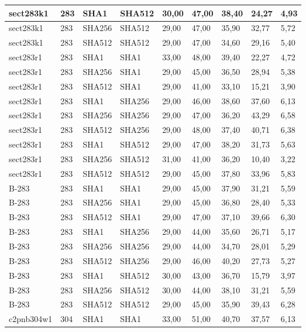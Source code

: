 \begin{longtable}{| l | l | l | l | l |l |l |l |l |}
sect283k1 & 283 & SHA1 & SHA512 & 30,00 & 47,00 & 38,40 & 24,27 & 4,93 \\ \hline 
sect283k1 & 283 & SHA256 & SHA512 & 29,00 & 47,00 & 35,90 & 32,77 & 5,72 \\ \hline 
sect283k1 & 283 & SHA512 & SHA512 & 29,00 & 47,00 & 34,60 & 29,16 & 5,40 \\ \hline 
sect283r1 & 283 & SHA1 & SHA1 & 33,00 & 48,00 & 39,40 & 22,27 & 4,72 \\ \hline 
sect283r1 & 283 & SHA256 & SHA1 & 29,00 & 45,00 & 36,50 & 28,94 & 5,38 \\ \hline 
sect283r1 & 283 & SHA512 & SHA1 & 29,00 & 41,00 & 33,10 & 15,21 & 3,90 \\ \hline 
sect283r1 & 283 & SHA1 & SHA256 & 29,00 & 46,00 & 38,60 & 37,60 & 6,13 \\ \hline 
sect283r1 & 283 & SHA256 & SHA256 & 29,00 & 47,00 & 36,20 & 43,29 & 6,58 \\ \hline 
sect283r1 & 283 & SHA512 & SHA256 & 29,00 & 48,00 & 37,40 & 40,71 & 6,38 \\ \hline 
sect283r1 & 283 & SHA1 & SHA512 & 29,00 & 47,00 & 38,20 & 31,73 & 5,63 \\ \hline 
sect283r1 & 283 & SHA256 & SHA512 & 31,00 & 41,00 & 36,20 & 10,40 & 3,22 \\ \hline 
sect283r1 & 283 & SHA512 & SHA512 & 29,00 & 45,00 & 37,80 & 33,96 & 5,83 \\ \hline 
B-283 & 283 & SHA1 & SHA1 & 29,00 & 45,00 & 37,90 & 31,21 & 5,59 \\ \hline 
B-283 & 283 & SHA256 & SHA1 & 29,00 & 45,00 & 36,80 & 28,40 & 5,33 \\ \hline 
B-283 & 283 & SHA512 & SHA1 & 29,00 & 47,00 & 37,10 & 39,66 & 6,30 \\ \hline 
B-283 & 283 & SHA1 & SHA256 & 29,00 & 44,00 & 35,60 & 26,71 & 5,17 \\ \hline 
B-283 & 283 & SHA256 & SHA256 & 29,00 & 44,00 & 34,70 & 28,01 & 5,29 \\ \hline 
B-283 & 283 & SHA512 & SHA256 & 29,00 & 46,00 & 40,20 & 27,73 & 5,27 \\ \hline 
B-283 & 283 & SHA1 & SHA512 & 30,00 & 43,00 & 36,70 & 15,79 & 3,97 \\ \hline 
B-283 & 283 & SHA256 & SHA512 & 30,00 & 44,00 & 38,10 & 31,21 & 5,59 \\ \hline 
B-283 & 283 & SHA512 & SHA512 & 29,00 & 45,00 & 35,90 & 39,43 & 6,28 \\ \hline 
c2pnb304w1 & 304 & SHA1 & SHA1 & 33,00 & 51,00 & 40,70 & 37,57 & 6,13 \\ \hline 

\end{longtable}
